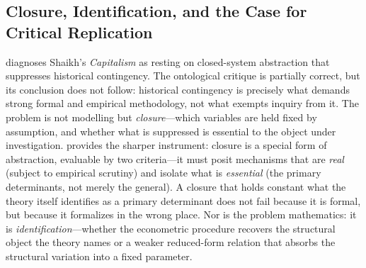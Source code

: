 \subsection{Closure, Identification, and the Case for Critical Replication}
\label{sec:case_for_cr}

\citet{Patomaki2017} diagnoses Shaikh's \emph{Capitalism} as resting on closed-system abstraction that suppresses historical contingency. The ontological critique is partially correct, but its conclusion does not follow: historical contingency is precisely what demands strong formal and empirical methodology, not what exempts inquiry from it. The problem is not modelling but \emph{closure}---which variables are held fixed by assumption, and whether what is suppressed is essential to the object under investigation. \citet{Nikiforos2021closure} provides the sharper instrument: closure is a special form of abstraction, evaluable by two criteria---it must posit mechanisms that are \emph{real} (subject to empirical scrutiny) and isolate what is \emph{essential} (the primary determinants, not merely the general). A closure that holds constant what the theory itself identifies as a primary determinant does not fail because it is formal, but because it formalizes in the wrong place. Nor is the problem mathematics: it is \emph{identification}---whether the econometric procedure recovers the structural object the theory names or a weaker reduced-form relation that absorbs the structural variation into a fixed parameter.

